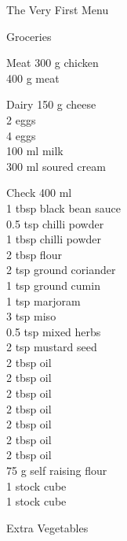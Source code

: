 \begin{menu}{The Very First Menu}
\begin{shoppinglist}{Groceries}
      \end{shoppinglist}%
      \par\vfil %
      \begin{shoppinglist}{Meat}
      300 g chicken \\ 
      400 g meat \\ 
      \end{shoppinglist}%
      \begin{shoppinglist}{Dairy}
      150 g cheese \\ 
      2  eggs \\ 
      4  eggs \\ 
      100 ml milk \\ 
      300 ml soured cream \\ 
      \end{shoppinglist}%
      \par\vfil %
      \vfil\clearpage %
      \begin{shoppinglist}{Check}
      400 ml  \\ 
      1 tbsp black bean sauce \\ 
      0.5 tsp chilli powder \\ 
      1 tbsp chilli powder \\ 
      2 tbsp flour \\ 
      2 tsp ground coriander \\ 
      1 tsp ground cumin \\ 
      1 tsp marjoram \\ 
      3 tsp miso \\ 
      0.5 tsp mixed herbs \\ 
      2 tsp mustard seed \\ 
      2 tbsp oil \\ 
      2 tbsp oil \\ 
      2 tbsp oil \\ 
      2 tbsp oil \\ 
      2 tbsp oil \\ 
      2 tbsp oil \\ 
      2 tbsp oil \\ 
      75 g self raising flour \\ 
      1  stock cube \\ 
      1  stock cube \\ 
      \end{shoppinglist}%
      \begin{shoppinglist}{Extra Vegetables}

\end{shoppinglist}
\end{menu}
